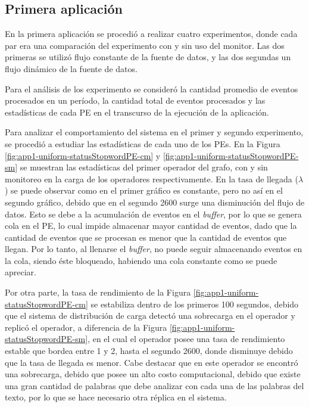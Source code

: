 \subsection{Primera aplicación}
En la primera aplicación se procedió a realizar cuatro experimentos, donde cada par era una comparación del experimento con y sin uso del monitor. Las dos primeras se utilizó flujo constante de la fuente de datos, y las dos segundas un flujo dinámico de la fuente de datos.

Para el análisis de los experimento se consideró la cantidad promedio de eventos procesados en un período, la cantidad total de eventos procesados y las estadísticas de cada PE en el transcurso de la ejecución de la aplicación.

Para analizar el comportamiento del sistema en el primer y segundo experimento, se procedió a estudiar las estadísticas de cada uno de los PEs. En la Figura \ref{fig:app1-uniform-statusStopwordPE-cm} y \ref{fig:app1-uniform-statusStopwordPE-sm} se muestran las estadísticas del primer operador del grafo, con y sin monitoreo en la carga de los operadores respectivamente. En la tasa de llegada ($\lambda$) se puede observar como en el primer gráfico es constante, pero no así en el segundo gráfico, debido que en el segundo 2600 surge una disminución del flujo de datos. Esto se debe a la acumulación de eventos en el \textit{buffer}, por lo que se genera cola en el PE, lo cual impide almacenar mayor cantidad de eventos, dado que la cantidad de eventos que se procesan es menor que la cantidad de eventos que llegan. Por lo tanto, al llenarse el \textit{buffer}, no puede seguir almacenando eventos en la cola, siendo éste bloqueado, habiendo una cola constante como se puede apreciar.

Por otra parte, la tasa de rendimiento de la Figura \ref{fig:app1-uniform-statusStopwordPE-cm} se estabiliza dentro de los primeros 100 segundos, debido que el sistema de distribución de carga detectó una sobrecarga en el operador y replicó el operador, a diferencia de la Figura \ref{fig:app1-uniform-statusStopwordPE-sm}, en el cual el operador posee una tasa de rendimiento estable que bordea entre 1 y 2, hasta el segundo 2600, donde disminuye debido que la tasa de llegada es menor. Cabe destacar que en este operador se encontró una sobrecarga, debido que posee un alto costo computacional, debido que existe una gran cantidad de palabras que debe analizar con cada una de las palabras del texto, por lo que se hace necesario otra réplica en el sistema.

